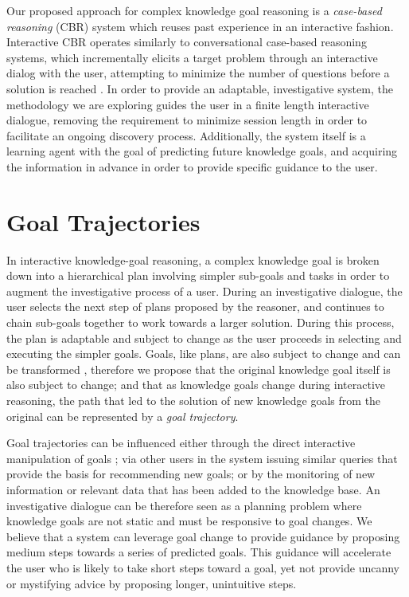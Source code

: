 \documentclass[letterpaper]{article}
\begin{document}
Our proposed approach for complex knowledge goal reasoning is a \textit{case-based reasoning} (CBR) \cite{kolodner_case-based_1993,lopez_de_mantaras_retrieval_2005} system which reuses past experience in an interactive fashion. Interactive CBR operates similarly to conversational case-based reasoning systems, which incrementally elicits a target problem through an interactive dialog with the user, attempting to minimize the number of questions before a solution is reached \cite{aha_advances_2005}. In order to provide an adaptable, investigative system, the methodology we are exploring guides the user in a finite length interactive dialogue, removing the requirement to minimize session length in order to facilitate an ongoing discovery process. Additionally, the system itself is a learning agent with the goal of predicting future knowledge goals, and acquiring the information in advance in order to provide specific guidance to the user.

\section{Goal Trajectories}

In interactive knowledge-goal reasoning, a complex knowledge goal is broken down into a hierarchical plan involving simpler sub-goals and tasks in order to augment the investigative process of a user. During an investigative dialogue, the user selects the next step of plans proposed by the reasoner, and continues to chain sub-goals together to work towards a larger solution. During this process, the plan is adaptable and subject to change as the user proceeds in selecting and executing the simpler goals. Goals, like plans, are also subject to change and can be transformed \cite{cox_goal_1998}, therefore we propose that the original knowledge goal itself is also subject to change; and that as knowledge goals change during interactive reasoning, the path that led to the solution of new knowledge goals from the original can be represented by a \textit{goal trajectory}.

Goal trajectories can be influenced either through the direct interactive manipulation of goals \cite{cox_mixed-initiative_2007}; via other users in the system issuing similar queries that provide the basis for recommending new goals; or by the monitoring of new information or relevant data that has been added to the knowledge base. An investigative dialogue can be therefore seen as a planning problem where knowledge goals are not static and must be responsive to goal changes. We believe that a system can leverage goal change to provide guidance by proposing medium steps towards a series of predicted goals. This guidance will accelerate the user who is likely to take short steps toward a goal, yet not provide uncanny or mystifying advice by proposing longer, unintuitive steps.
\end{document}
